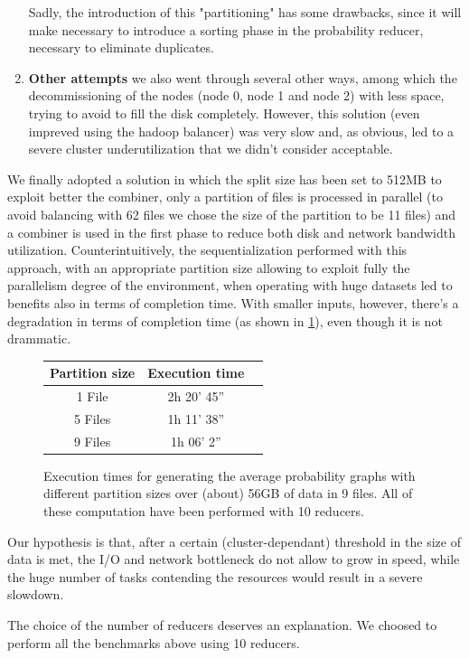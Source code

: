 \begin{enumerate}
Sadly, the introduction of this "partitioning" has some drawbacks, since it will make necessary to introduce a sorting phase in the probability reducer, necessary to eliminate duplicates.
\item \textbf{Other attempts} we also went through several other ways, among which the decommissioning of the nodes (node 0, node 1 and node 2) with less space, trying to avoid to fill the disk completely.
However, this solution (even impreved using the hadoop balancer) was very slow and, as obvious, led to a severe cluster underutilization that we didn't consider acceptable.
\end{enumerate}
We finally adopted a solution in which the split size has been set to 512MB to exploit better the combiner, only a partition of files is processed in parallel (to avoid balancing with 62 files we chose the size of the partition to be 11 files) and a combiner is used in the first phase to reduce both disk and network bandwidth utilization.
Counterintuitively, the sequentialization performed with this approach, with an appropriate partition size allowing to exploit fully the parallelism degree of the environment, when operating with huge datasets led to benefits also in terms of completion time. 
With smaller inputs, however, there's a degradation in terms of completion time (as shown in \ref{fig:partitioningtimes}), even though it is not drammatic.

\begin{figure}[H]
\centering
\begin{tabular}{| c | c | r |}
\hline
\textbf{Partition size} & \textbf{Execution time} \\
\hline
1 File & 2h 20' 45'' \\
\hline
5 Files &  1h 11' 38''\\
\hline
9 Files & 1h 06' 2'' \\
\hline
\end{tabular}
\caption{Execution times for generating the average probability graphs with different partition sizes over (about) 56GB of data in 9 files. All of these computation have been performed with 10 reducers.}
\label{fig:partitioningtimes}
\end{figure}

Our hypothesis is that, after a certain (cluster-dependant) threshold in the size of data is met, the I/O and network bottleneck do not allow to grow in speed, while the huge number of tasks contending the resources would result in a severe slowdown.


The choice of the number of reducers deserves an explanation.
We choosed to perform all the benchmarks above using 10 reducers. 

